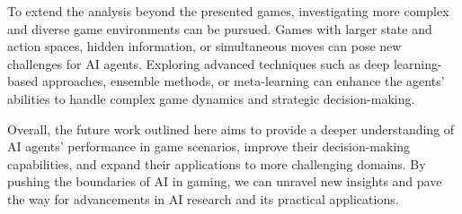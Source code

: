 \documentclass{article}
\begin{document}
To extend the analysis beyond the presented games, investigating more complex and diverse game environments can be pursued. Games with larger state and action spaces, hidden information, or simultaneous moves can pose new challenges for AI agents. Exploring advanced techniques such as deep learning-based approaches, ensemble methods, or meta-learning can enhance the agents' abilities to handle complex game dynamics and strategic decision-making.

Overall, the future work outlined here aims to provide a deeper understanding of AI agents' performance in game scenarios, improve their decision-making capabilities, and expand their applications to more challenging domains. By pushing the boundaries of AI in gaming, we can unravel new insights and pave the way for advancements in AI research and its practical applications.
\end{document}
